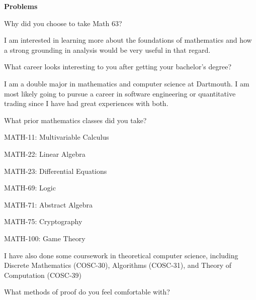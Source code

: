 \documentclass[11pt]{amsart}
\begin{document}
\setlength{\headheight}{13.0pt}
\setlength{\footskip}{13.0pt}

\bigskip

\noindent 
\begin{center} {\bf Problems} \end{center}

\begin{enumarabic}
  \item Why did you choose to take Math 63?
  
    \begin{Answer}
      I am interested in learning more about the foundations of mathematics
      and how a strong grounding in analysis would be very useful in that regard.
    \end{Answer}
  
  \item What career looks interesting to you after getting your bachelor's degree?
  
    \begin{Answer}
      I am a double major in mathematics and computer science at Dartmouth.
      I am most likely going to pursue a career in software engineering
      or quantitative trading since I have had great experiences with both.
    \end{Answer}
  
  \item What prior mathematics classes did you take?
  
    \begin{Answer}
      \begin{enumroman}
        \item MATH-11: Multivariable Calculus
        \item MATH-22: Linear Algebra
        \item MATH-23: Differential Equations
        \item MATH-69: Logic
        \item MATH-71: Abstract Algebra
        \item MATH-75: Cryptography
        \item MATH-100: Game Theory
      \end{enumroman}

      I have also done some coursework in theoretical computer science,
      including Discrete Mathematics (COSC-30), Algorithms (COSC-31),
      and Theory of Computation (COSC-39)
    \end{Answer}
  
  \newpage
  \item What methods of proof do you feel comfortable with?
  

\end{enumarabic}
\end{document}
